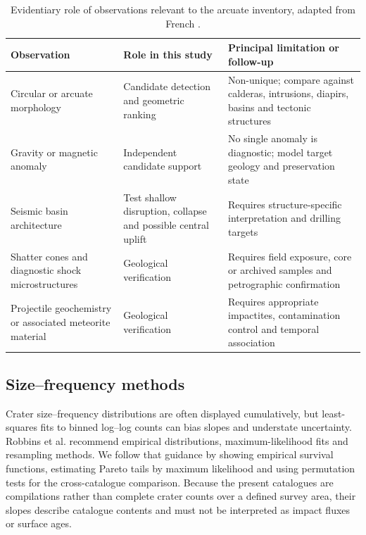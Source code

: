 \documentclass[11pt]{article}
\begin{document}
\begin{table}[H]
\centering
\caption{Evidentiary role of observations relevant to the arcuate inventory, adapted from French \cite[pp.~97--100, 107--110]{French1998}.}
\label{tab:evidence}
\small
\begin{tabular}{>{\raggedright\arraybackslash}p{}>{\raggedright\arraybackslash}p{}>{\raggedright\arraybackslash}p{}}
\toprule
Observation & Role in this study & Principal limitation or follow-up\\
\midrule
Circular or arcuate morphology & Candidate detection and geometric ranking & Non-unique; compare against calderas, intrusions, diapirs, basins and tectonic structures\\
Gravity or magnetic anomaly & Independent candidate support & No single anomaly is diagnostic; model target geology and preservation state\\
Seismic basin architecture & Test shallow disruption, collapse and possible central uplift & Requires structure-specific interpretation and drilling targets\\
Shatter cones and diagnostic shock microstructures & Geological verification & Requires field exposure, core or archived samples and petrographic confirmation\\
Projectile geochemistry or associated meteorite material & Geological verification & Requires appropriate impactites, contamination control and temporal association\\
\bottomrule
\end{tabular}
\end{table}

\subsection{Size--frequency methods}
Crater size--frequency distributions are often displayed cumulatively, but least-squares fits to binned log--log counts can bias slopes and understate uncertainty. Robbins et al. \cite{Robbins2018} recommend empirical distributions, maximum-likelihood fits and resampling methods. We follow that guidance by showing empirical survival functions, estimating Pareto tails by maximum likelihood and using permutation tests for the cross-catalogue comparison. Because the present catalogues are compilations rather than complete crater counts over a defined survey area, their slopes describe catalogue contents and must not be interpreted as impact fluxes or surface ages.
\end{document}
